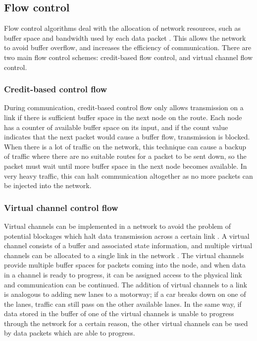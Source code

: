 \documentclass[a4paper, 12pt]{article}
\begin{document}
\subsection{Flow control}

Flow control algorithms deal with the allocation of network resources, such as buffer space and bandwidth used by each data packet \cite{Jon97}. This allows the network to avoid buffer overflow, and increases the efficiency of communication. There are two main flow control schemes: credit-based flow control, and virtual channel flow control.

\subsubsection{Credit-based control flow}

During communication, credit-based control flow only allows transmission on a link if there is sufficient buffer space in the next node on the route. Each node has a counter of available buffer space on its input, and if the count value indicates that the next packet would cause a buffer flow, transmission is blocked. When there is a lot of traffic on the network, this technique can cause a backup of traffic where there are no suitable routes for a packet to be sent down, so the packet must wait until more buffer space in the next node becomes available. In very heavy traffic, this can halt communication altogether as no more packets can be injected into the network.

\subsubsection{Virtual channel control flow}

Virtual channels can be implemented in a network to avoid the problem of potential blockages which halt data transmission across a certain link \cite{Dal92}. A virtual channel consists of a buffer and associated state information, and multiple virtual channels can be allocated to a single link in the network \cite{Dal87}. The virtual channels provide multiple buffer spaces for packets coming into the node, and when data in a channel is ready to progress, it can be assigned access to the physical link and communication can be continued. The addition of virtual channels to a link is analogous to adding new lanes to a motorway; if a car breaks down on one of the lanes, traffic can still pass on the other available lanes. In the same way, if data stored in the buffer of one of the virtual channels is unable to progress through the network for a certain reason, the other virtual channels can be used by data packets which are able to progress.
\end{document}
